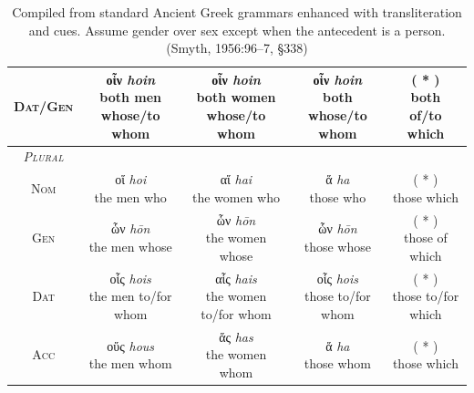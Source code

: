 \documentclass[10pt,a4paper,notitlepage]{article}
\newcommand{\tsc}[1]{\textsc{#1}}
\newcommand*{\grc}[1]{\fontspec{Inter}#1\rmfamily}
\newcommand{\trc}[1]{\textit{\fontspec{Tinos}#1}}
\begin{document}
\begin{table}[H]
\begin{tabular}{c|ccc|c}
            \tsc{Dat/Gen} & \makecell{\grc{οἷν} \trc{hoin} \\ \small both men \\whose/to whom} & \makecell{\grc{οἷν} \trc{hoin} \\ \small both women \\whose/to whom} & \makecell{\grc{οἷν} \trc{hoin} \\ \small both \\whose/to whom} & \makecell{( * ) \\ \small both \\of/to which} \\
            \hline
            \emph{\tsc{Plural}} & & & & \\
            \tsc{Nom} & \makecell{\grc{οἵ} \trc{hoi} \\ \small the men who} & \makecell{\grc{αἵ} \trc{hai} \\ \small the women who} & \makecell{\grc{ἅ} \trc{ha} \\ \small those who} & \makecell{( * ) \\ \small those which} \\
            \tsc{Gen} & \makecell{\grc{ὧν} \trc{hōn} \\ \small the men whose} & \makecell{\grc{ὧν} \trc{hōn} \\ \small the women whose} & \makecell{\grc{ὧν} \trc{hōn} \\ \small those whose} & \makecell{( * ) \\ \small those of which} \\
            \tsc{Dat} & \makecell{\grc{οἷς} \trc{hois} \\ \small the men to/for whom} & \makecell{\grc{αἷς} \trc{hais}\\ \small the women to/for whom} & \makecell{\grc{οἷς} \trc{hois} \\ \small those to/for whom} & \makecell{( * ) \\ \small those to/for which} \\
            \tsc{Acc} & \makecell{\grc{οὕς} \trc{hous} \\ \small the men whom} & \makecell{\grc{ἅς} \trc{has} \\ \small the women whom} & \makecell{\grc{ἅ} \trc{ha} \\ \small those whom} & \makecell{( * ) \\ \small those which} \\
        \end{tabular}
        \caption{Compiled from standard Ancient Greek grammars enhanced with transliteration and cues.
            Assume gender over sex except when the antecedent is a person.
            (Smyth, 1956:96--7, \S338)}
    \end{table}
\end{document}
